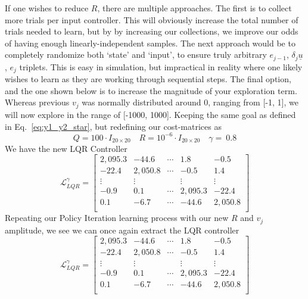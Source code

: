 If one wishes to reduce $R$, there are multiple approaches. The first is to collect more trials per input controller. This will obviously increase the total number of trials needed to learn, but by by increasing our collections, we improve our odds of having enough linearly-independent samples. The next approach would be to completely randomize both `state' and `input', to ensure truly arbitrary $e_{j-1}$, $\delta_j\underline{u}$, $e_j$ triplets. This is easy in simulation, but impractical in reality where one likely wishes to learn as they are working through sequential steps. The final option, and the one shown below is to increase the magnitude of your exploration term.
Whereas previous $v_j$ was normally distributed around 0, ranging from [-1, 1], we will now explore in the range of [-1000, 1000]. Keeping the same goal as defined in Eq.~\ref{eq:y1_y2_star}, but redefining our cost-matrices as
\begin{equation}
    Q=100\cdot I_{20 \times 20}
    \quad
    R={10}^{-6}\cdot I_{20 \times 20}
    \quad
    \gamma=\ 0.8
\end{equation}
We have the new LQR Controller
\begin{equation}
    \mathcal{L}_{LQR}^\gamma=\left[\begin{matrix}2,095.3&-44.6&\cdots&1.8&-0.5\\-22.4&2,050.8&\cdots&-0.5&1.4\\\vdots&\vdots&&\vdots&\vdots\\-0.9&0.1&\cdots&2,095.3&-22.4\\0.1&-6.7&\cdots&-44.6&2,050.8\\\end{matrix}\right]
    \label{eq:rl_ilc_lqr_small_R_controller}
\end{equation}
Repeating our Policy Iteration learning process with our new $R$ and $v_j$ amplitude, we see we can once again extract the LQR controller
\begin{equation}
    \mathcal{L}_{LQR}^\gamma=\left[\begin{matrix}2,095.3&-44.6&\cdots&1.8&-0.5\\-22.4&2,050.8&\cdots&-0.5&1.4\\\vdots&\vdots&&\vdots&\vdots\\-0.9&0.1&\cdots&2,095.3&-22.4\\0.1&-6.7&\cdots&-44.6&2,050.8\\\end{matrix}\right]
    \label{eq:rl_ilc_policy_small_R_controller}
\end{equation}
